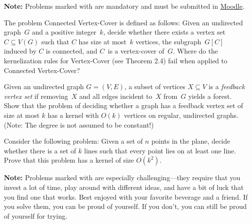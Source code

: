 \documentclass{uebung_cs}
\begin{document}
\textbf{Note:} Problems marked with \mandatory are mandatory and must be submitted in \href{https://moodle.studiumdigitale.uni-frankfurt.de/moodle/course/view.php?id=6259}{Moodle}.

\begin{exercise}
  \label{ex:CVC}
  The problem Connected Vertex-Cover is defined as follows: Given an undirected graph~$G$ and a positive integer~$k$, decide whether there exists a vertex set $C\subseteq V(G)$ such that $C$ has size at most~$k$ vertices, the subgraph~$G[C]$ induced by $C$ is connected, and $C$~is a vertex-cover of~$G$.
  Where do the kernelization rules for Vertex-Cover (see Theorem 2.4) fail when applied to Connected Vertex-Cover?
\end{exercise}

\begin{exercise}
  Given an undirected graph $G = (V, E)$, a subset of vertices $X \subseteq V$ is a \emph{feedback vertex
  set} if removing~$X$ and all edges incident to~$X$ from~$G$ yields a forest. Show that the problem of deciding
  whether a graph has a feedback vertex set of size at most $k$ has a kernel with $O(k)$ vertices on regular,
  undirected graphs. (Note: The degree is not assumed to be constant!)
\end{exercise}

\begin{exercise}
  Consider the following problem: Given a set of $n$ points in the plane, decide whether
  there is a set of $k$ lines such that every point lies on at least one line. Prove that this problem has a
  kernel of size $O(k^2)$.
\end{exercise}%

\textbf{Note:} Problems marked with \hard are especially challenging---they require that you invest a lot of time, play around with different ideas, and have a bit of luck that you find one that works. Best enjoyed with your favorite beverage and a friend. If you solve them, you can be proud of yourself. If you don't, you can still be proud of yourself for trying.
\end{document}
